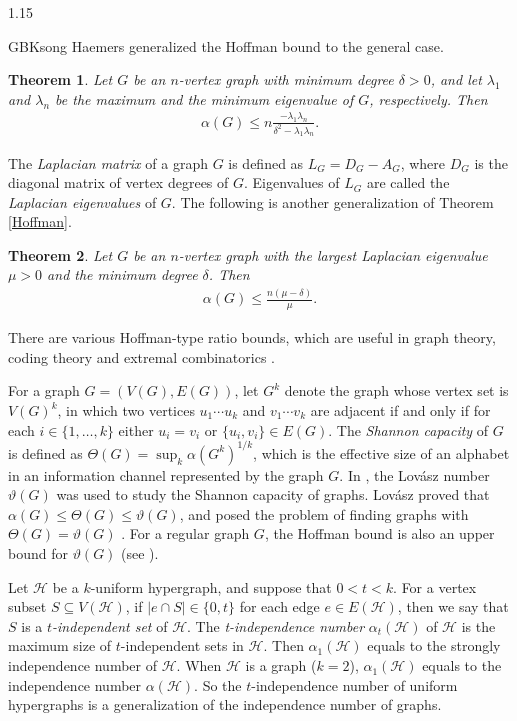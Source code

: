 \documentclass[preprint,12pt]{elsarticle}
\newtheorem{thm}{Theorem}[section]
\begin{document}
\begin{spacing}{1.15}
\begin{CJK*}{GBK}{song}
Haemers generalized the Hoffman bound to the general case.
\begin{thm}\label{thm1.2}
\textup{\cite[Theorem 3.3]{Haemers}} Let $G$ be an $n$-vertex graph with minimum degree $\delta>0$, and let $\lambda_1$ and $\lambda_n$ be the maximum and the minimum eigenvalue of $G$, respectively. Then
\begin{eqnarray*}
\alpha(G)\leq n\frac{-\lambda_1\lambda_n}{\delta^2-\lambda_1\lambda_n}.
\end{eqnarray*}
\end{thm}
The \textit{Laplacian matrix} of a graph $G$ is defined as $L_G=D_G-A_G$, where $D_G$ is the diagonal matrix of vertex degrees of $G$. Eigenvalues of $L_G$ are called the \textit{Laplacian eigenvalues} of $G$. The following is another generalization of Theorem \ref{Hoffman}.
\begin{thm}\label{thm1.3}
\textup{\cite[Corollary 3.6]{Godsil}} Let $G$ be an $n$-vertex graph with the largest Laplacian eigenvalue $\mu>0$ and the minimum degree $\delta$. Then
\begin{eqnarray*}
\alpha(G)\leq\frac{n(\mu-\delta)}{\mu}.
\end{eqnarray*}
\end{thm}
There are various Hoffman-type ratio bounds, which are useful in graph theory, coding theory and extremal combinatorics \cite{Delsarte,EllisFilmus,Ellis,Godsil,Haemers}.

For a graph $G=(V(G),E(G))$, let $G^k$ denote the graph whose vertex set is $V(G)^k$, in which two vertices $u_1\cdots u_k$ and $v_1\cdots v_k$ are adjacent if and only if for each $i\in\{1,\ldots,k\}$ either $u_i=v_i$ or $\{u_i,v_i\}\in E(G)$. The \textit{Shannon capacity} \cite{Alon,shannon1} of $G$ is defined as $\Theta(G)=\sup_{k}\alpha(G^k)^{1/k}$, which is the effective size of an alphabet in an information channel represented by the graph $G$. In \cite{L}, the Lov\'{a}sz number $\vartheta(G)$ was used to study the Shannon capacity of graphs. Lov\'{a}sz proved that $\alpha(G)\leq\Theta(G)\leq\vartheta(G)$, and posed the problem of finding graphs with $\Theta(G)=\vartheta(G)$ \cite[Problem 1]{L}. For a regular graph $G$, the Hoffman bound is also an upper bound for $\vartheta(G)$ (see \cite[Theorem 9]{L}).

Let $\mathcal{H}$ be a $k$-uniform hypergraph, and suppose that $0<t<k$. For a vertex subset $S\subseteq V(\mathcal{H})$, if $|e\cap S|\in\{0,t\}$ for each edge $e\in E(\mathcal{H})$, then we say that $S$ is a \textit{$t$-independent set} of $\mathcal{H}$. The \textit{t-independence number} $\alpha_t(\mathcal{H})$ of $\mathcal{H}$ is the maximum size of $t$-independent sets in $\mathcal{H}$. Then $\alpha_1(\mathcal{H})$ equals to the strongly independence number \cite{ZhouLi} of $\mathcal{H}$. When $\mathcal{H}$ is a graph ($k=2$), $\alpha_1(\mathcal{H})$ equals to the independence number $\alpha(\mathcal{H})$. So the $t$-independence number of uniform hypergraphs is a generalization of the independence number of graphs.


\end{CJK*}
\end{spacing}
\end{document}
